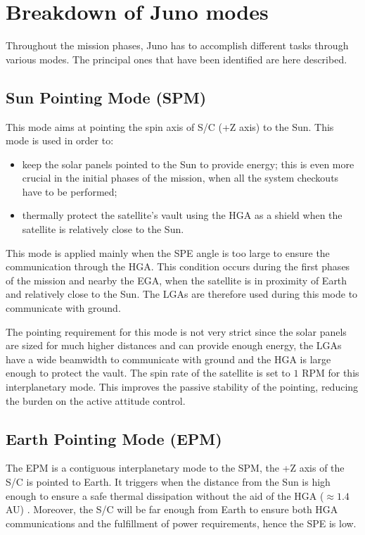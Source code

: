 \section{Breakdown of Juno modes}
\label{sec:AOCS_modes}

Throughout the mission phases, Juno has to accomplish different tasks through various modes. The principal ones that have been identified are here described.

\subsection{Sun Pointing Mode (SPM)}
\label{subsec:sun_pointing_mode}

This mode aims at pointing the spin axis of S/C (+Z axis) to the Sun. This mode is used in order to:
\begin{itemize}
    \item keep the solar panels pointed to the Sun to provide energy; this is even more crucial in the initial phases of the mission, when all the system checkouts have to be performed;
    \item thermally protect the satellite's vault using the HGA as a shield when the satellite is relatively close to the Sun.
\end{itemize}

This mode is applied mainly when the SPE angle is too large to ensure the communication through the HGA. This condition occurs during the first phases of the mission and nearby the EGA, when the satellite is in proximity of Earth and relatively close to the Sun. The LGAs are therefore used during this mode to communicate with ground.

The pointing requirement for this mode is not very strict since the solar panels are sized for much higher distances and can provide enough energy, the LGAs have a wide beamwidth to communicate with ground and the HGA is large enough to protect the vault.
The spin rate of the satellite is set to $1$ RPM for this interplanetary mode. This improves the passive stability of the pointing, reducing the burden on the active attitude control.

\subsection{Earth Pointing Mode (EPM)}
\label{subsec:earth_pointing_mode}

The EPM is a contiguous interplanetary mode to the SPM, the +Z axis of the S/C is pointed to Earth.
It triggers when the distance from the Sun is high enough to ensure a safe thermal dissipation without the aid of the HGA ($\approx 1.4$ AU) \mref.
Moreover, the S/C will be far enough from Earth to ensure both HGA communications and the fulfillment of power requirements, hence the SPE is low.


